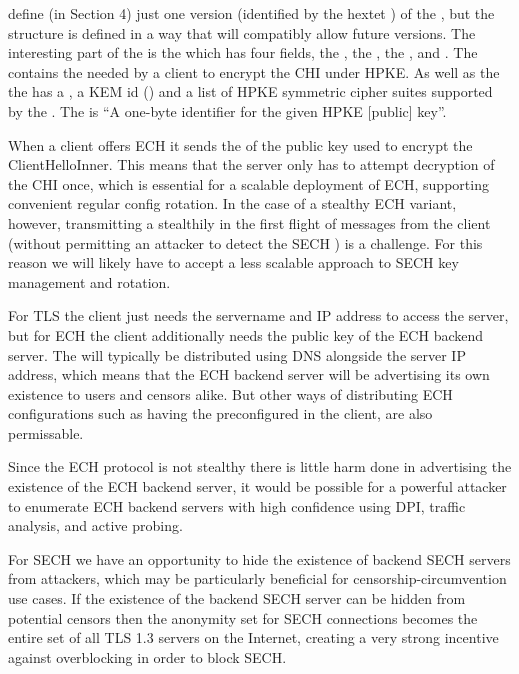 \cite{esni} define (in Section 4) just one version (identified by the hextet ) of the , but  the structure is defined in a way that will compatibly allow future versions.
The interesting part of the  is the  which has four fields,
the , the , the , and .
The  contains the  needed by a client to encrypt the \ac{CHI} under \ac{HPKE}.
As well as the  the  has a ,
a \ac{KEM} id () and a list of \ac{HPKE} symmetric cipher suites supported by the .
The  is ``A one-byte identifier for the given \ac{HPKE} [public] key''.

When a client offers \ac{ECH} it sends the  of the public key used to encrypt the ClientHelloInner.
This  means that the server only has to attempt decryption of the \ac{CHI} once,
which is essential for a scalable deployment of \ac{ECH},
supporting convenient regular config rotation.
In the case of a stealthy \ac{ECH} variant, however, transmitting a  stealthily in the first flight of messages from the client (without permitting an attacker to detect the \ac{SECH} ) is a challenge.
For this reason we will likely have to accept a less scalable approach
to \ac{SECH} key management and rotation.

For \ac{TLS} the client just needs the servername and IP address to access the server,
but for \ac{ECH} the client additionally needs the public key of the \ac{ECH} backend server.
The  will typically be distributed using \ac{DNS} alongside the server \ac{IP} address,
which means that the \ac{ECH} backend server will be advertising its own existence to users and censors alike.
But other ways of distributing \ac{ECH} configurations
such as having the  preconfigured in the client, are also permissable.

Since the \ac{ECH} protocol is not stealthy there is little harm done in advertising the existence of the \ac{ECH} backend server,
it would be possible for a powerful attacker to enumerate \ac{ECH} backend servers with high confidence using \ac{DPI}, traffic analysis, and active probing.

For \ac{SECH} we have an opportunity to hide
the existence of backend \ac{SECH} servers from attackers,
which may be particularly beneficial for censorship-circumvention use cases.
If the existence of the backend \ac{SECH} server can be hidden from potential censors then the anonymity set for \ac{SECH} connections becomes the entire set
of all \ac{TLS} 1.3 servers on the Internet,
creating a very strong incentive against overblocking in order to block \ac{SECH}.





